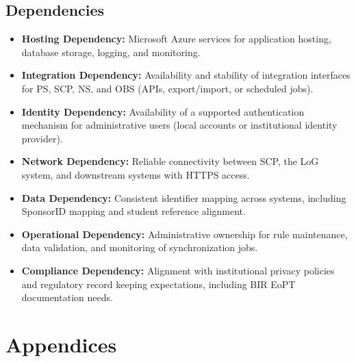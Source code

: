 \documentclass[12pt,a4paper]{article}
\begin{document}
\subsection{Dependencies}
\begin{itemize}
  \item \textbf{Hosting Dependency:} Microsoft Azure services for application hosting, database storage, logging, and monitoring.
  \item \textbf{Integration Dependency:} Availability and stability of integration interfaces for PS, SCP, NS, and OBS (APIs, export/import, or scheduled jobs).
  \item \textbf{Identity Dependency:} Availability of a supported authentication mechanism for administrative users (local accounts or institutional identity provider).
  \item \textbf{Network Dependency:} Reliable connectivity between SCP, the LoG system, and downstream systems with HTTPS access.
  \item \textbf{Data Dependency:} Consistent identifier mapping across systems, including SponsorID mapping and student reference alignment.
  \item \textbf{Operational Dependency:} Administrative ownership for rule maintenance, data validation, and monitoring of synchronization jobs.
  \item \textbf{Compliance Dependency:} Alignment with institutional privacy policies and regulatory record keeping expectations, including BIR EoPT documentation needs.
\end{itemize}


\section{Appendices}
\end{document}
